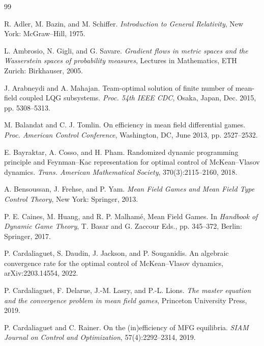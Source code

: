 \documentclass{amsart}
\theoremstyle{definition}
\theoremstyle{remark}
\numberwithin{equation}{section}
\begin{document}


\begin{thebibliography}{99}


R. Adler, M. Bazin, and M. Schiffer.
{\it Introduction to General Relativity}, New York: McGraw--Hill, 1975.



 L. Ambrosio, N. Gigli, and G. Savare. {\it  Gradient flows in metric spaces and the Wasserstein
spaces of probability measures}, Lectures in Mathematics, ETH Zurich: Birkhauser, 2005.




J. Arabneydi and A. Mahajan.
Team-optimal solution of finite number of mean-field coupled LQG
subsystems. {\it Proc.  54th IEEE CDC},
 Osaka, Japan, Dec. 2015, pp. 5308--5313.





M. Balandat and C. J. Tomlin.
On efficiency in mean field differential games. {\it Proc. American Control Conference},
Washington, DC, June 2013, pp. 2527--2532.


E. Bayraktar, A. Cosso, and H. Pham. Randomized dynamic programming principle and Feynman--Kac
representation for optimal control of McKean--Vlasov dynamics. {\it  Trans. American Mathematical Society},
370(3):2115--2160, 2018.



A. Bensoussan, J. Frehse, and P. Yam.
{\it Mean Field Games and Mean Field Type Control Theory},
New York: Springer,   2013.




P. E. Caines, M. Huang, and R. P. Malham\'e, Mean Field Games. In {\it Handbook of Dynamic Game Theory},
T. Basar and G. Zaccour Eds., pp. 345--372,  Berlin: Springer,  2017.





P. Cardaliaguet, S. Daudin, J. Jackson, and P. Souganidis.
An algebraic convergence rate for the optimal control of McKean--Vlasov dynamics,        arXiv:2203.14554,  2022.


P. Cardaliaguet, F. Delarue, J.-M. Lasry, and P.-L. Lions. {\it  The master equation and the
convergence problem in mean field games}, Princeton University Press, 2019.

P. Cardaliaguet and C. Rainer. On the (in)efficiency of {MFG} equilibria. {\it SIAM Journal on Control and Optimization},
57(4):2292--2314, 2019.



\end{thebibliography}
\end{document}
